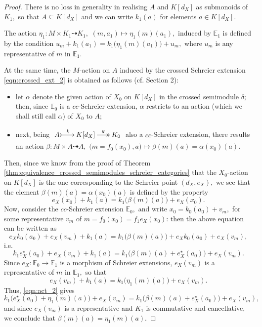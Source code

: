 \documentclass[a4paper]{amsart}
\theoremstyle{plain}
\theoremstyle{definition}
\theoremstyle{remark}
\begin{document}
\begin{proof}
There is no loss in generality in realising $A$ and $K[d_X]$ as submonoids of $K_1,$ so that $A\subseteq K[d_X]$ and we can write $k_1(a)$ for elements $a\in K[d_X].$

The action $\eta_1\colon M\times K_1\dashrightarrow K_1,$ $(m,a_1)\mapsto\eta_1(m)(a_1),$ induced by ${\mathbb{E}}_1$ is defined by the condition $u_m+k_1(a_1)=k_1\big(\eta_1(m)(a_1)\big)+u_m,$ where $u_m$ is any representative of $m$ in ${\mathbb{E}}_1.$

At the same time, the $M$-action on $A$ induced by the crossed Schreier extension \eqref{eqn:crossed_ext_2} is obtained as follows (cf. Section 2):
\begin{itemize}
\item let $\alpha$ denote the given action of $X_0$ on $K[d_X]$ in the crossed semimodule $\delta;$ then, since ${\mathbb{E}}_0$ is a $cc$-Schreier extension, $\alpha$ restricts to an action (which we shall still call $\alpha$) of $X_0$ to $A;$
\item next, being $\xymatrixcolsep{1.5pc}\xymatrix{A \ar@{>->}[r]^-k &{K[d_X]} \ar@{->>}[r]^-g &{K_0}}$ also a $cc$-Schreier extension, there results an action $\beta\colon M\times A\dashrightarrow A,$ $\big(m=f_0(x_0),a\big)\mapsto \beta(m)(a)=\alpha(x_0)(a).$
\end{itemize}
Then, since we know from the proof of Theorem \ref{thm:equivalence_crossed_semimodules_schreier_categories} that the $X_0$-action on $K[d_X]$ is the one corresponding to the Schreier point $(d_X,e_X),$ we see that the element $\beta(m)(a)=\alpha(x_0)(a)$ is defined by the property
\begin{equation*}
e_X(x_0)+k_1(a)=k_1\big(\beta(m)(a)\big)+e_X(x_0).
\end{equation*}
Now, consider the $cc$-Schreier extension ${\mathbb{E}}_0,$ and write $x_0=k_0(a_0)+v_m,$ for some representative $v_m$ of $m=f_0(x_0)=f_1e_X(x_0)$: then the above equation can be written as
\begin{equation*}
e_Xk_0(a_0)+e_X(v_m)+k_1(a)=k_1\big(\beta(m)(a)\big)+e_Xk_0(a_0)+e_X(v_m),
\end{equation*}
i.e.
\begin{equation}
\label{eqn:act_2}
k_1e^\star_X(a_0)+e_X(v_m)+k_1(a)=k_1\big(\beta(m)(a)+e^\star_X(a_0)\big)+e_X(v_m).
\end{equation}
Since $e_X\colon{\mathbb{E}}_0\longrightarrow{\mathbb{E}}_1$ is a morphism of Schreier extensions, $e_X(v_m)$ is a representative of $m$ in ${\mathbb{E}}_1,$ so that
\begin{equation*}
	e_X(v_m)+k_1(a)=k_1\big(\eta_1(m)(a)\big)+e_X(v_m).
\end{equation*}
Thus, \eqref{eqn:act_2} gives
\begin{equation*}
k_1\big(e^\star_X(a_0)+\eta_1(m)(a)\big)+e_X(v_m)=k_1\big(\beta(m)(a)+e^\star_X(a_0)\big)+e_X(v_m),
\end{equation*}
and since $e_X(v_m)$ is a representative and $K_1$ is commutative and cancellative, we conclude that $\beta(m)(a)=\eta_1(m)(a).$
\end{proof}
\end{document}
